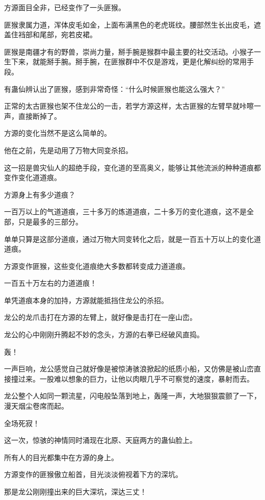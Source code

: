 \begin{this_body}
方源面目全非，已经变作了一头匪猴。

匪猴隶属力道，浑体皮毛如金，上面布满黑色的老虎斑纹。腰部然生长出皮毛，遮盖住裆部和尾部，宛若皮裙。

匪猴是南疆才有的野兽，崇尚力量，掰手腕是猴群中最主要的社交活动。小猴子一生下来，就能掰手腕。掰手腕，在匪猴群中不仅是游戏，更是化解纠纷的常用手段。

有蛊仙辨认出了匪猴，感到非常奇怪：“什么时候匪猴也能这么强大？”

正常的太古匪猴也架不住龙公的一击，若学方源这样，太古匪猴的左臂早就咔嚓一声，直接断掉了。

方源的变化当然不是这么简单的。

他在之前，先是动用了万物大同变杀招。

这一招是兽灾仙人的超绝手段，变化道的至高奥义，能够让其他流派的种种道痕都变作变化道道痕。

方源身上有多少道痕？

一百万以上的气道道痕，三十多万的炼道道痕，二十多万的变化道痕，这不是全部，只是最多的三部分。

单单只算是这部分道痕，通过万物大同变转化之后，就是一百五十万以上的变化道道痕。

方源变作匪猴，这些变化道痕绝大多数都转变成力道道痕。

一百五十万左右的力道道痕！

单凭道痕本身的加持，方源就能抵挡住龙公的杀招。

龙公的龙爪击打在方源的左臂上，就好像是击打在一座山峦。

龙公的心中刚刚升腾起不妙的念头，方源的右拳已经破风直捣。

轰！

一声巨响，龙公感觉自己就好像是被惊涛骇浪掀起的纸质小船，又仿佛是被山峦直接撞过来。一股难以想象的巨力，让他以肉眼几乎不可察觉的速度，暴射而去。

龙公整个人如同一颗流星，闪电般坠落到地上，轰隆一声，大地狠狠震颤了一下，漫天烟尘卷席而起。

全场死寂！

这一次，惊骇的神情同时涌现在北原、天庭两方的蛊仙脸上。

所有人的目光都集中在方源的身上。

方源变作的匪猴傲立船首，目光淡淡俯视着下方的深坑。

那是龙公刚刚撞出来的巨大深坑，深达三丈！

\end{this_body}

